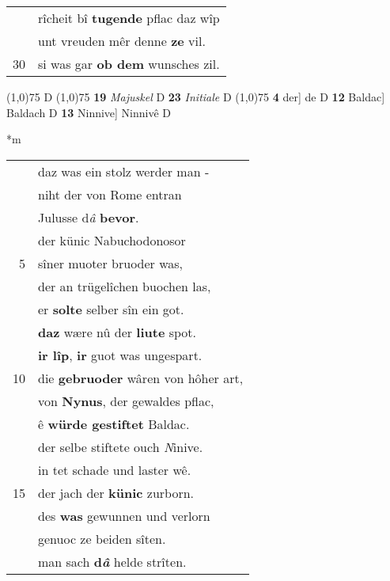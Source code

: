 \documentclass[8pt,a4paper,notitlepage]{article}
\begin{document}
\begin{table}[ht]
\begin{minipage}[t]{0.5\linewidth}
\begin{tabular}{rl}
 & rîcheit bî \textbf{tugende} pflac daz wîp\\ 
 & unt vreuden mêr denne \textbf{ze} vil.\\ 
30 & si was gar \textbf{ob dem} wunsches zil.\\ 
\end{tabular}
\scriptsize
\line(1,0){75} \newline
D \newline
\line(1,0){75} \newline
\textbf{19} \textit{Majuskel} D  \textbf{23} \textit{Initiale} D  \newline
\line(1,0){75} \newline
\textbf{4} der] de D \textbf{12} Baldac] Baldach D \textbf{13} Ninnive] Ninnivê D \newline
\end{minipage}
\hspace{0.5cm}
\begin{minipage}[t]{0.5\linewidth}
\small
\begin{center}*m
\end{center}
\begin{tabular}{rl}
 & daz was ein stolz werder man -\\ 
 & niht der von Rome entran\\ 
 & Julusse d\textit{â} \textbf{bevor}.\\ 
 & der künic Nabuchodonosor\\ 
5 & sîner muoter bruoder was,\\ 
 & der an trügelîchen buochen las,\\ 
 & er \textbf{solte} selber sîn ein got.\\ 
 & \textbf{daz} wære nû der \textbf{liute} spot.\\ 
 & \textbf{ir lîp}, \textbf{ir} guot was ungespart.\\ 
10 & die \textbf{gebruoder} wâren von hôher art,\\ 
 & von \textbf{Nynus}, der gewaldes pflac,\\ 
 & ê \textbf{würde gestiftet} Baldac.\\ 
 & der selbe stiftete ouch \textit{N}inive.\\ 
 & in tet schade und laster wê.\\ 
15 & der jach der \textbf{künic} zurborn.\\ 
 & des \textbf{was} gewunnen und verlorn\\ 
 & genuoc ze beiden sîten.\\ 
 & man sach \textbf{d\textit{â}} helde strîten.\\ 

\end{tabular}
\end{minipage}
\end{table}
\end{document}
